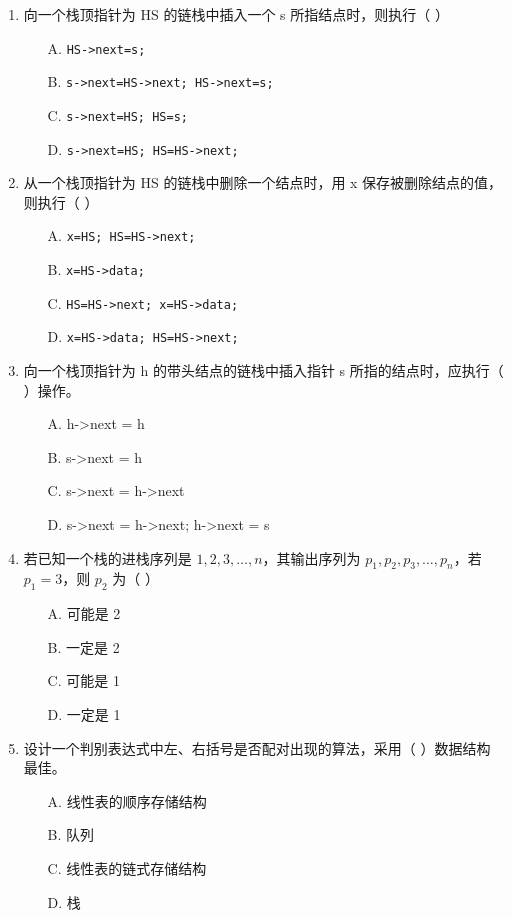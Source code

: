 \documentclass[12pt, a4paper]{article}
\begin{document}
\begin{enumerate}[label=\arabic*.]
	\item 向一个栈顶指针为 HS 的链栈中插入一个 s 所指结点时，则执行（ ）
	      \begin{enumerate}
		      \item[A.] \texttt{HS->next=s;}
		      \item[B.] \texttt{s->next=HS->next; HS->next=s;}
		      \item[C.] \texttt{s->next=HS; HS=s;}
		      \item[D.] \texttt{s->next=HS; HS=HS->next;}
	      \end{enumerate}

	\item 从一个栈顶指针为 HS 的链栈中删除一个结点时，用 x 保存被删除结点的值，则执行（ ）
	      \begin{enumerate}
		      \item[A.] \texttt{x=HS; HS=HS->next;}
		      \item[B.] \texttt{x=HS->data;}
		      \item[C.] \texttt{HS=HS->next; x=HS->data;}
		      \item[D.] \texttt{x=HS->data; HS=HS->next;}
	      \end{enumerate}

	\item 向一个栈顶指针为 h 的带头结点的链栈中插入指针 s 所指的结点时，应执行（ ）操作。
	      \begin{enumerate}
		      \item[A.] h->next = h
		      \item[B.] s->next = h
		      \item[C.] s->next = h->next
		      \item[D.] s->next = h->next; h->next = s
	      \end{enumerate}

	\item 若已知一个栈的进栈序列是 $1, 2, 3, \dots, n$，其输出序列为 $p_1, p_2, p_3, \dots, p_n$，若 $p_1=3$，则 $p_2$ 为（ ）
	      \begin{enumerate}
		      \item[A.] 可能是 2
		      \item[B.] 一定是 2
		      \item[C.] 可能是 1
		      \item[D.] 一定是 1
	      \end{enumerate}

	\item 设计一个判别表达式中左、右括号是否配对出现的算法，采用（ ）数据结构最佳。
	      \begin{enumerate}
		      \item[A.] 线性表的顺序存储结构
		      \item[B.] 队列
		      \item[C.] 线性表的链式存储结构
		      \item[D.] 栈
	      \end{enumerate}


\end{enumerate}
\end{document}
